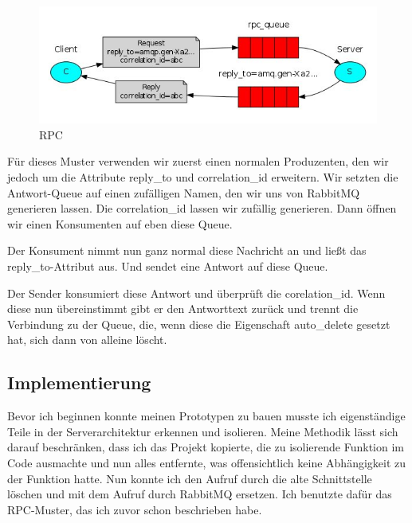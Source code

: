 \documentclass[12pt,a4paper]{scrartcl}
\begin{document}
\begin{figure}[h!]
	\centering
	\includegraphics[scale=0.74]{RPC.jpg}
	\caption[https://www.rabbitmq.com/tutorials/tutorial-six-dotnet.html]{RPC}
\end{figure}

Für dieses Muster verwenden wir zuerst einen normalen Produzenten, den wir jedoch um die Attribute reply\_to und correlation\_id erweitern. Wir setzten die Antwort-Queue auf einen zufälligen Namen, den wir uns von RabbitMQ generieren lassen. 
Die correlation\_id lassen wir zufällig generieren. Dann öffnen wir einen Konsumenten auf eben diese Queue.

Der Konsument nimmt nun ganz normal diese Nachricht an und ließt das reply\_to-Attribut aus. Und sendet eine Antwort auf diese Queue.

Der Sender konsumiert diese Antwort und überprüft die corelation\_id. Wenn diese nun übereinstimmt gibt er den Antworttext zurück und trennt die Verbindung zu der Queue, die, wenn diese die Eigenschaft auto\_delete gesetzt hat, sich dann von alleine löscht.

\subsection{Implementierung}

Bevor ich beginnen konnte meinen Prototypen zu bauen musste ich eigenständige Teile in der Serverarchitektur erkennen und isolieren. 
Meine Methodik lässt sich darauf beschränken, dass ich das Projekt kopierte, die zu isolierende Funktion im Code ausmachte und nun alles entfernte, was offensichtlich keine Abhängigkeit zu der Funktion hatte. 
Nun konnte ich den Aufruf durch die alte Schnittstelle löschen und mit dem Aufruf durch RabbitMQ ersetzen. Ich benutzte dafür das RPC-Muster, das ich zuvor schon beschrieben habe. 
\end{document}
